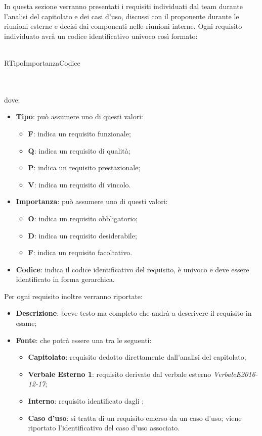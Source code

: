 \documentclass[AdR.tex]{subfiles}
\begin{document}
In questa sezione verranno presentati i requisiti individuati dal team durante l'analisi del capitolato
e dei casi d'uso, discussi con il proponente durante le riunioni esterne e decisi dai componenti
nelle riunioni interne.
Ogni requisito individuato avrà un codice identificativo univoco così formato: \\ \\
\centerline{R\textbraceleft{}Tipo\textbraceright{}\textbraceleft{}Importanza\textbraceright{}\textbraceleft{}Codice\textbraceright{}}
 \\ \\
dove:
\begin{itemize}
 	\item \textbf{Tipo}: può assumere uno di questi valori:
 	\begin{itemize}
 		\item \textbf{F}: indica un requisito funzionale;
 		\item \textbf{Q}: indica un requisito di qualità;
 		\item \textbf{P}: indica un requisito prestazionale;
 		\item \textbf{V}: indica un requisito di vincolo.
 	\end{itemize}
 	\item \textbf{Importanza}: può assumere uno di questi valori:
 	\begin{itemize}
 		\item \textbf{O}: indica un requisito obbligatorio;
 		\item \textbf{D}: indica un requisito desiderabile;
 		\item \textbf{F}: indica un requisito facoltativo.
 	\end{itemize}
 	\item \textbf{Codice}: indica il codice identificativo del requisito, è univoco e deve essere identificato in forma gerarchica.
 \end{itemize}
Per ogni requisito inoltre verranno riportate:
\begin{itemize}
	\item \textbf{Descrizione}: breve testo ma completo che andrà a descrivere il requisito in esame;
	\item \textbf{Fonte}: che potrà essere una tra le seguenti:
	\begin{itemize}
		\item \textbf{Capitolato}: requisito dedotto direttamente dall'analisi del capitolato;
		\item \textbf{Verbale Esterno 1}: requisito derivato dal verbale esterno \textit{Verbale\textunderscore{}E\textunderscore{}2016-12-17};
		\item \textbf{Interno}: requisito identificato dagli \ANP;
		\item \textbf{Caso d'uso}: si tratta di un requisito emerso da un caso d'uso; viene riportato l'identificativo del caso d'uso associato.
	\end{itemize}
\end{itemize}
\end{document}
